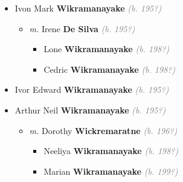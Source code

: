 \documentclass[10pt, openany]{book}
\begin{document}
\begin{itemize}
{\begin{itemize}
{\begin{itemize}
{\begin{itemize}
{\begin{itemize}
{\begin{itemize}
{ }
\end{itemize}}
\end{itemize}
 }
\item{Patrick \textbf{Wikramanayake} \textcolor{gray}{\textit{(b. 199?)}}
 }
\item{Therese Manique \textbf{Wikramanayake} \textcolor{gray}{\textit{(b. 199?)}}
  }
\item{Anne \textbf{Wikramanayake} \textcolor{gray}{\textit{(b. 199?)}}
 }
\item{Rita \textbf{Wikramanayake} \textcolor{gray}{\textit{(b. 200?)}}
 }
\end{itemize}}
\end{itemize}
  }
\item{Ivon Mark \textbf{Wikramanayake} \textcolor{gray}{\textit{(b. 195?)}}
\begin{itemize}
\item{\textit{m.} Irene \textbf{De Silva} \textcolor{gray}{\textit{(b. 195?)}}   \label{couple:00004038:00004039} \begin{itemize}
\item{Lone \textbf{Wikramanayake} \textcolor{gray}{\textit{(b. 198?)}}
 }
\item{Cedric \textbf{Wikramanayake} \textcolor{gray}{\textit{(b. 198?)}}
 }
\end{itemize}}
\end{itemize}
  }
\item{Ivor Edward \textbf{Wikramanayake} \textcolor{gray}{\textit{(b. 195?)}}
  }
\item{Arthur Neil \textbf{Wikramanayake} \textcolor{gray}{\textit{(b. 195?)}}
\begin{itemize}
\item{\textit{m.} Dorothy \textbf{Wickremaratne} \textcolor{gray}{\textit{(b. 196?)}}   \label{couple:00004043:00004044} \begin{itemize}
\item{Neeliya \textbf{Wikramanayake} \textcolor{gray}{\textit{(b. 198?)}}
 }
\item{Marian \textbf{Wikramanayake} \textcolor{gray}{\textit{(b. 199?)}}
}
\end{itemize}}
\end{itemize}}
\end{itemize}}
\end{itemize}
\end{document}
